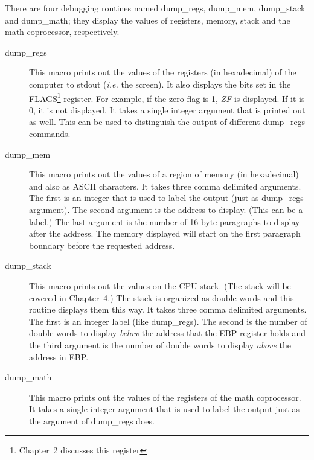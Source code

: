There are four debugging routines named {\code dump\_regs}, {\code
dump\_mem}, {\code dump\_stack} and {\code dump\_math}; they display
the values of registers, memory, stack and the math coprocessor,
respectively.
\begin{description}

\item[dump\_regs]
This macro prints out the values of the registers (in hexadecimal) of
the computer to {\code stdout} (\emph{i.e.} the screen). It also
displays the bits set in the FLAGS\footnote{Chapter~2 discusses this
register} register. For example, if the zero flag is 1, \emph{ZF} is
displayed. If it is 0, it is not displayed. It takes a single integer
argument that is printed out as well. This can be used to distinguish
the output of different {\code dump\_regs} commands.

\item[dump\_mem]
This macro prints out the values of a region of memory (in
hexadecimal) and also as ASCII characters. It takes three comma delimited
arguments. The first is an integer that is used to label the
output (just as {\code dump\_regs} argument). The second argument is
the address to display. (This can be a label.) The last argument is
the number of 16-byte paragraphs to display after the address. The
memory displayed will start on the first paragraph boundary before the
requested address.

\item[dump\_stack]
This macro prints out the values on the CPU stack. (The stack will be
covered in Chapter~4.) The stack is organized as double words and this
routine displays them this way. It takes three comma delimited
arguments. The first is an integer label (like {\code
dump\_regs}). The second is the number of double words to display
\emph{below} the address that the {\code EBP} register holds and the
third argument is the number of double words to display \emph{above}
the address in {\code EBP}.

\item[dump\_math]
This macro prints out the values of the registers of the math coprocessor.
It takes a single integer argument that is used to label the output just as
the argument of {\code dump\_regs} does.
\end{description}

